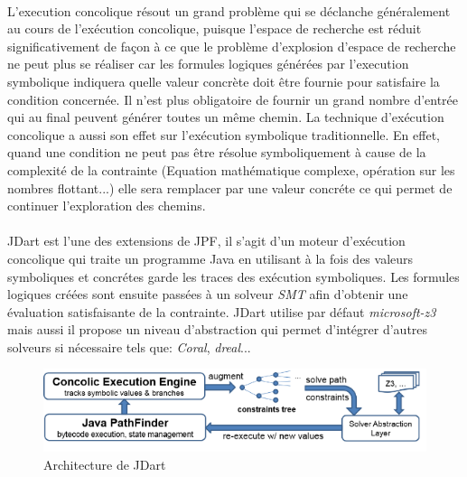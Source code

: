 			\paragraph{}
				L'execution concolique résout un grand problème qui se déclanche généralement au cours de l'exécution concolique,
				puisque l'espace de recherche est réduit significativement de façon à ce que le problème d'explosion d'espace de recherche
				ne peut plus se réaliser car les formules logiques générées par l'execution symbolique indiquera quelle valeur concrète
				doit être fournie pour satisfaire la condition concernée.
				Il n'est plus obligatoire de fournir un grand nombre d'entrée qui au final peuvent générer toutes un même chemin.
				\newline
				La technique d'exécution concolique a aussi son effet sur l'exécution symbolique traditionnelle.
				En effet, quand une condition ne peut pas être résolue symboliquement à cause de la complexité de la contrainte (Equation mathématique complexe,
				opération sur les nombres flottant...) elle sera remplacer par une valeur concréte ce qui permet de continuer l'exploration des chemins.

			\paragraph{}
				JDart est l'une des extensions de \gls{JPF}, il s'agit d'un moteur d'exécution concolique qui traite un programme Java
				en utilisant à la fois des valeurs symboliques et concrétes garde les traces des exécution symboliques.
				Les formules logiques créées sont ensuite passées à un solveur \textit{\gls{SMT}} afin d'obtenir une évaluation satisfaisante de la contrainte.
				JDart utilise par défaut \textit{\gls{microsoft-z3}} mais aussi il propose un niveau d'abstraction qui permet d'intégrer d'autres solveurs
				si nécessaire tels que: \textit{Coral}, \textit{dreal}...
				
			\begin{figure}[H]
				\centering
					\includegraphics[scale=0.5]{images/archJDart.png}
				\caption{Architecture de JDart}
			\end{figure}
				

